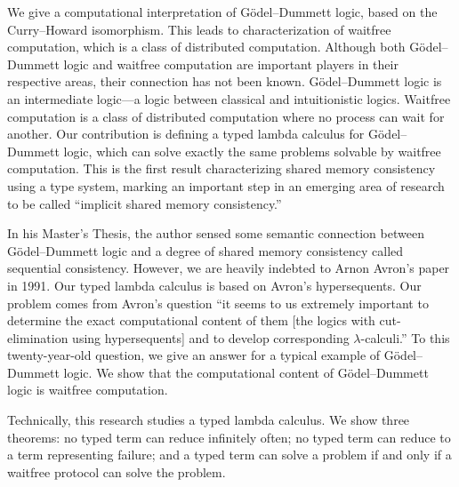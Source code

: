 \begin{eabstract}
 We give a computational interpretation of G\"odel--Dummett logic, based
 on the Curry--Howard isomorphism.  This leads to characterization
 of waitfree computation, which is a class of distributed
 computation.  Although both G\"odel--Dummett logic and waitfree computation are
 important players in their respective areas, their connection has not
 been known.  G\"odel--Dummett logic is an intermediate logic---a
 logic between classical and intuitionistic logics.
 Waitfree computation is a class of distributed computation where no process can
 wait for another.  Our contribution is defining a typed lambda calculus
 for G\"odel--Dummett logic, which can solve
 exactly the same problems solvable by waitfree computation.
 This is the first result characterizing shared memory consistency using
 a type system, marking an important step in
 an emerging area of research to be called ``implicit shared
 memory consistency.''

 In his Master's Thesis, the author sensed some semantic connection
 between G\"odel--Dummett logic and a degree of shared memory consistency
 called sequential consistency.
 However, we are heavily indebted to Arnon
 Avron's paper in 1991.  Our typed lambda calculus is based on Avron's
 hypersequents.
 Our problem comes from Avron's question
 ``it seems to us extremely important to determine the exact
 computational content of them [the logics with cut-elimination
 using hypersequents] and to develop corresponding $\lambda$-calculi.''
 To this twenty-year-old question, we give an answer for a typical
 example of G\"odel--Dummett logic.
 We show that the computational content of G\"odel--Dummett logic is
 waitfree computation.

 Technically, this research studies a typed lambda calculus.
 We show three theorems:
 no typed term can reduce infinitely often;
 no typed term can reduce to a term representing failure;
 and a typed term can solve a problem if and only if a waitfree protocol
 can solve the problem.

\end{eabstract}

